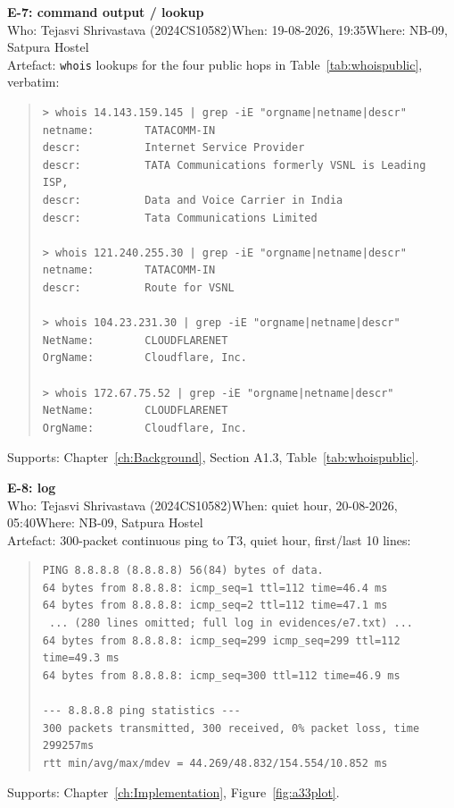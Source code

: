 \textbf{E-7: command output / lookup}\\
Who: Tejasvi Shrivastava (2024CS10582)\quad When: 19-08-2026, 19:35\quad Where: NB-09, Satpura Hostel\\
Artefact: \texttt{whois} lookups for the four public hops in Table~\ref{tab:whoispublic}, verbatim:
\begin{quote}\ttfamily\footnotesize
\begin{verbatim}
> whois 14.143.159.145 | grep -iE "orgname|netname|descr"
netname:        TATACOMM-IN
descr:          Internet Service Provider
descr:          TATA Communications formerly VSNL is Leading ISP,
descr:          Data and Voice Carrier in India
descr:          Tata Communications Limited

> whois 121.240.255.30 | grep -iE "orgname|netname|descr"
netname:        TATACOMM-IN
descr:          Route for VSNL

> whois 104.23.231.30 | grep -iE "orgname|netname|descr"
NetName:        CLOUDFLARENET
OrgName:        Cloudflare, Inc.

> whois 172.67.75.52 | grep -iE "orgname|netname|descr"
NetName:        CLOUDFLARENET
OrgName:        Cloudflare, Inc.
\end{verbatim}
\end{quote}
Supports: Chapter~\ref{ch:Background}, Section A1.3, Table~\ref{tab:whoispublic}.

\textbf{E-8: log}\\
Who: Tejasvi Shrivastava (2024CS10582)\quad When: quiet hour, 20-08-2026, 05:40\quad Where: NB-09, Satpura Hostel\\
Artefact: 300-packet continuous ping to T3, quiet hour, first/last 10 lines:
\begin{quote}\ttfamily\footnotesize
\begin{verbatim}
PING 8.8.8.8 (8.8.8.8) 56(84) bytes of data.
64 bytes from 8.8.8.8: icmp_seq=1 ttl=112 time=46.4 ms
64 bytes from 8.8.8.8: icmp_seq=2 ttl=112 time=47.1 ms
 ... (280 lines omitted; full log in evidences/e7.txt) ...
64 bytes from 8.8.8.8: icmp_seq=299 icmp_seq=299 ttl=112 time=49.3 ms
64 bytes from 8.8.8.8: icmp_seq=300 ttl=112 time=46.9 ms

--- 8.8.8.8 ping statistics ---
300 packets transmitted, 300 received, 0% packet loss, time 299257ms
rtt min/avg/max/mdev = 44.269/48.832/154.554/10.852 ms
\end{verbatim}
\end{quote}
Supports: Chapter~\ref{ch:Implementation}, Figure~\ref{fig:a33plot}.

